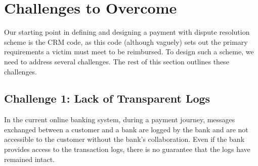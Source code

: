 
\vspace{-3mm}
\section{Challenges to Overcome}\label{sec:: challenges}
\vspace{-1mm}

Our starting point in defining and designing a payment with dispute resolution scheme is the CRM code, as this code (although vaguely) sets out the primary requirements a victim must meet to be reimbursed.  To design such a scheme, we need to address several challenges. The rest of this section outlines these challenges. 




\vspace{-3.2mm}
\subsection{Challenge 1: Lack of Transparent Logs} 
In the current online banking system, during a payment journey, messages exchanged between a customer and a bank are logged by the bank and are not accessible to the customer without the bank's collaboration. Even if the bank provides access to the transaction logs, there is no guarantee that the logs have remained intact.


